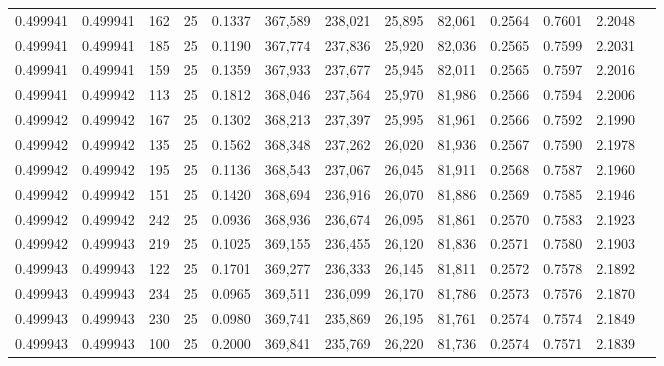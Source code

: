 \begin{tabular}{rrrrrrrrrrrrr}
0.499941 & 0.499941 &   162 &  25 &                                     0.1337 & 367,589 & 238,021 &  25,895 &  82,061 & 0.2564 & 0.7601 & 2.2048 \\
0.499941 & 0.499941 &   185 &  25 &                                     0.1190 & 367,774 & 237,836 &  25,920 &  82,036 & 0.2565 & 0.7599 & 2.2031 \\
0.499941 & 0.499941 &   159 &  25 &                                     0.1359 & 367,933 & 237,677 &  25,945 &  82,011 & 0.2565 & 0.7597 & 2.2016 \\
0.499941 & 0.499942 &   113 &  25 &                                     0.1812 & 368,046 & 237,564 &  25,970 &  81,986 & 0.2566 & 0.7594 & 2.2006 \\
0.499942 & 0.499942 &   167 &  25 &                                     0.1302 & 368,213 & 237,397 &  25,995 &  81,961 & 0.2566 & 0.7592 & 2.1990 \\
0.499942 & 0.499942 &   135 &  25 &                                     0.1562 & 368,348 & 237,262 &  26,020 &  81,936 & 0.2567 & 0.7590 & 2.1978 \\
0.499942 & 0.499942 &   195 &  25 &                                     0.1136 & 368,543 & 237,067 &  26,045 &  81,911 & 0.2568 & 0.7587 & 2.1960 \\
0.499942 & 0.499942 &   151 &  25 &                                     0.1420 & 368,694 & 236,916 &  26,070 &  81,886 & 0.2569 & 0.7585 & 2.1946 \\
0.499942 & 0.499942 &   242 &  25 &                                     0.0936 & 368,936 & 236,674 &  26,095 &  81,861 & 0.2570 & 0.7583 & 2.1923 \\
0.499942 & 0.499943 &   219 &  25 &                                     0.1025 & 369,155 & 236,455 &  26,120 &  81,836 & 0.2571 & 0.7580 & 2.1903 \\
0.499943 & 0.499943 &   122 &  25 &                                     0.1701 & 369,277 & 236,333 &  26,145 &  81,811 & 0.2572 & 0.7578 & 2.1892 \\
0.499943 & 0.499943 &   234 &  25 &                                     0.0965 & 369,511 & 236,099 &  26,170 &  81,786 & 0.2573 & 0.7576 & 2.1870 \\
0.499943 & 0.499943 &   230 &  25 &                                     0.0980 & 369,741 & 235,869 &  26,195 &  81,761 & 0.2574 & 0.7574 & 2.1849 \\
0.499943 & 0.499943 &   100 &  25 &                                     0.2000 & 369,841 & 235,769 &  26,220 &  81,736 & 0.2574 & 0.7571 & 2.1839 \\

\end{tabular}
